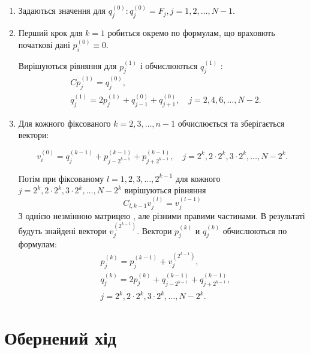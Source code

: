 \begin{enumerate}

    \item Задаються значення для 
    $q_j^{(0)}: q_j^{(0)}=F_j, j=1,2, \ldots, N-1$.

    \item Перший крок для $k=1$ робиться окремо по формулам, що враховють 
    початкові дані $p_i^{(0)} \equiv 0$. 
    
    
    Вирішуються рівняння для $p_j^{(1)}$ і обчислюються $q_j^{(1)}$ :
    $$
    \begin{aligned}
    & C p_j^{(1)}=q_j^{(0)}, \\
    & q_j^{(1)}=2 p_j^{(1)}+q_{j-1}^{(0)}+q_{j+1}^{(0)}, \quad j=2,4,6, \ldots, N-2 .
    \end{aligned}
    $$

    \item Для кожного фіксованого $k=2,3, \ldots, n-1$ обчислюється 
    та зберігається вектори:


    $$
    v_i^{(0)}=q_j^{(k-1)}+p_{j-2^{k-1}}^{(k-1)}+p_{j+2^{k-1}}^{(k-1)}, \quad j=2^k, 2 \cdot 2^k, 3 \cdot 2^k, \ldots, N-2^k .
    $$

    Потім при фіксованому $l=1,2,3, \ldots, 2^{k-1}$ для кожного 
    $j=2^k, 2 \cdot 2^k, 3 \cdot 2^k, \ldots, N-2^k$ вирішуються рівняння
    $$
    C_{l, k-1} v_j^{(l)}=v_j^{(l-1)}
    $$
    З однією незмінною матрицею , але різними правими частинами. В результаті будуть знайдені вектори $v_j^{\left(2^{k-1}\right)}$. 
    Вектори $p_j^{(k)}$ и $q_j^{(k)}$ обчислюються по формулам:
    $$
    \begin{aligned}
    & p_j^{(k)}=p_j^{(k-1)}+v_j^{\left(2^{k-1}\right)}, \\
    & q_j^{(k)}=2 p_j^{(k)}+q_{j-2^{k-1}}^{(k-1)}+q_{j+2^{k-1}}^{(k-1)}, \\
    & j=2^k, 2 \cdot 2^k, 3 \cdot 2^k, \ldots, N-2^k .
    \end{aligned}
    $$

\end{enumerate}

\section{Обернений хід}


